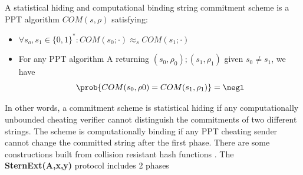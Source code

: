 \begin{definition}
  A statistical hiding and computational binding string commitment scheme is a PPT algorithm $COM(s,\rho)$ satisfying:
  \begin{itemize}
  \item $\forall s_{o}, s_{1} \in \{0,1\}^{*}: COM(s_{0};\cdot) \approx_{s} COM(s_{1};\cdot)$
  \item For any PPT algorithm A returning $(s_{0}, \rho_{0});(s_{1},\rho_{1})$
    given $s_{0} \neq s_{1}$, we have
    $$\prob{COM(s_{0},\rho{0}) = COM(s_{1}, \rho_{1})} = \negl$$
  \end{itemize}
\end{definition}

In other words, a commitment scheme is statistical hiding if any computationally unbounded cheating verifier cannot distinguish the commitments of two different strings. The scheme is computationally binding if any PPT cheating sender cannot change the committed string after the first phase. There are some constructions built from collision resistant hash functions \cite{damgaard1993existence, halevi1996practical}. The \textbf{SternExt(A,x,y)} protocol includes 2 phases
